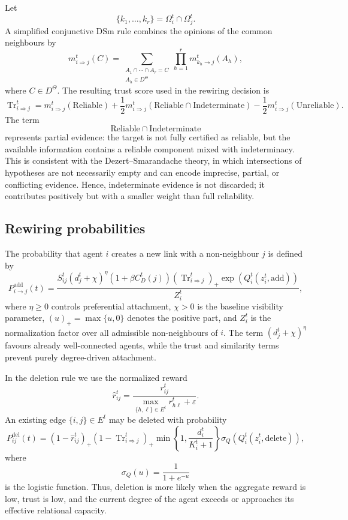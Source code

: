 \documentclass[11pt,a4paper]{article}
\begin{document}
Let
\[
\{k_1,\ldots,k_r\}=\Omega_i^t\cap\Omega_j^t.
\]
A simplified conjunctive DSm rule combines the opinions of the common neighbours
by
\[
m_{i\Rightarrow j}^t(C)
=
\sum_{\substack{
		A_1\cap\cdots\cap A_r=C\\
		A_h\in D^\Theta
}}
\prod_{h=1}^r
m_{k_h\to j}^t(A_h),
\tag{A10}
\]
where $C\in D^\Theta$. The resulting trust score used in the rewiring decision is
\[
\operatorname{Tr}_{i\Rightarrow j}^t
=
m_{i\Rightarrow j}^t(\mathrm{Reliable})
+
\frac{1}{2}
m_{i\Rightarrow j}^t(\mathrm{Reliable}\cap\mathrm{Indeterminate})
-
\frac{1}{2}
m_{i\Rightarrow j}^t(\mathrm{Unreliable}).
\tag{A11}
\]
The term
\[
\mathrm{Reliable}\cap\mathrm{Indeterminate}
\]
represents partial evidence: the target is not fully certified as reliable, but the
available information contains a reliable component mixed with indeterminacy. This
is consistent with the Dezert--Smarandache theory, in which intersections of
hypotheses are not necessarily empty and can encode imprecise, partial, or
conflicting evidence. Hence, indeterminate evidence is not discarded; it contributes
positively but with a smaller weight than full reliability.

\subsection{Rewiring probabilities}

The probability that agent $i$ creates a new link with a non-neighbour $j$ is
defined by
\[
P_{i\to j}^{\mathrm{add}}(t)
=
\frac{
	S_{ij}^t
	\left(d_j^t+\chi\right)^\eta
	\left(1+\beta C_D^t(j)\right)
	\left(\operatorname{Tr}_{i\Rightarrow j}^t\right)_+
	\exp\!\left(Q_i^t(z_i^t,\mathrm{add})\right)
}{
	Z_i^t
},
\tag{A12}
\]
where $\eta\geq 0$ controls preferential attachment, $\chi>0$ is the baseline
visibility parameter, $(u)_+=\max\{u,0\}$ denotes the positive part, and $Z_i^t$ is
the normalization factor over all admissible non-neighbours of $i$. The term
$(d_j^t+\chi)^\eta$ favours already well-connected agents, while the trust and
similarity terms prevent purely degree-driven attachment.

In the deletion rule we use the normalized reward
\[
\widehat r_{ij}^t=
\frac{r_{ij}^t}{\max_{\{h,\ell\}\in E^t}r_{h\ell}^t+\varepsilon}.
\]
An existing edge $\{i,j\}\in E^t$ may be deleted with probability
\[
P_{ij}^{\mathrm{del}}(t)
=
\left(1-\widehat r_{ij}^t\right)_+
\left(1-\operatorname{Tr}_{i\Rightarrow j}^t\right)_+
\min\left\{1,\frac{d_i^t}{K_i^t+1}\right\}
\sigma_Q\!\left(Q_i^t(z_i^t,\mathrm{delete})\right),
\tag{A13}
\]
where
\[
\sigma_Q(u)=\frac{1}{1+e^{-u}}
\]
is the logistic function. Thus, deletion is more likely when the aggregate reward is
low, trust is low, and the current degree of the agent exceeds or approaches its
effective relational capacity.
\end{document}
